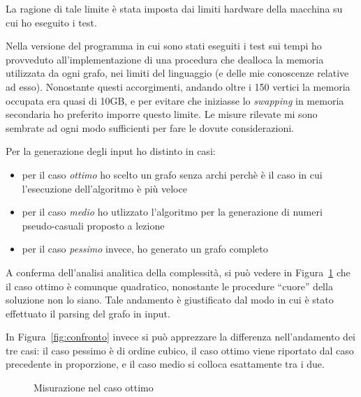 \documentclass[a4paper,8pt]{article}
\theoremstyle{definition}
\theoremstyle{remark}
\begin{document}
La ragione di tale limite è stata imposta dai limiti hardware della macchina su
cui ho eseguito i test.

Nella versione del programma in cui sono stati eseguiti i test sui tempi ho provveduto
all'implementazione di una procedura che dealloca la memoria utilizzata da ogni grafo,
nei limiti del linguaggio (e delle mie conoscenze relative ad esso). Nonostante
questi accorgimenti, andando oltre i 150 vertici la memoria occupata era quasi di 10GB, e
per evitare che iniziasse lo \textit{swapping} in memoria secondaria ho preferito
imporre questo limite. Le misure rilevate mi sono sembrate ad ogni modo sufficienti
per fare le dovute considerazioni.

\bigskip\noindent
Per la generazione degli input ho distinto in casi:

\begin{itemize}
  \item per il caso \emph{ottimo} ho scelto un grafo senza archi perchè è il caso
    in cui l'esecuzione dell'algoritmo è più veloce
  \item per il caso \emph{medio} ho utlizzato l'algoritmo per la generazione di numeri pseudo-casuali
    proposto a lezione
  \item per il caso \emph{pessimo} invece, ho generato un grafo completo
\end{itemize}

A conferma dell'analisi analitica della complessità, si può vedere in Figura~\ref{fig:ottimo}
che il caso ottimo è comunque quadratico, nonostante le procedure ``cuore'' della
soluzione non lo siano. Tale andamento è giustificato dal modo in cui è stato effettuato
il parsing del grafo in input.

\bigskip
In Figura~\ref{fig:confronto} invece si può apprezzare la differenza nell'andamento
dei tre casi: il caso pessimo è di ordine cubico, il caso ottimo viene riportato
dal caso precedente in proporzione, e il caso medio si colloca esattamente tra i due.

\begin{figure}[H]
  \centering
  \caption{Misurazione nel caso ottimo}
\label{fig:ottimo}
\end{figure}
\end{document}
